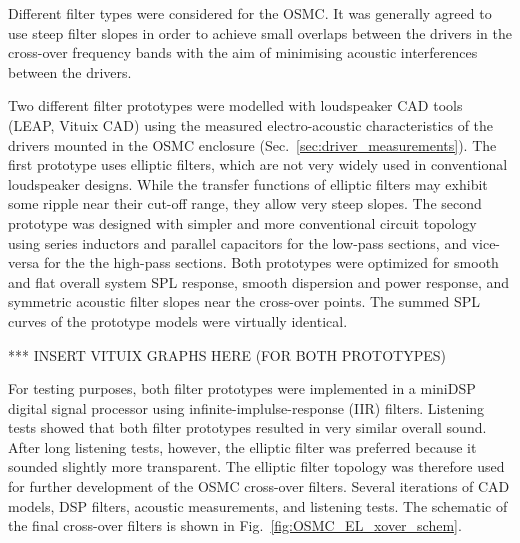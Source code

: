 \documentclass[12pt,a4paper]{article}
\providecommand{\figr}[1]{Fig.~\ref{fig:#1}}
\providecommand{\sectn}[1]{Sec.~\ref{sec:#1}}
\begin{document}
Different filter types were considered for the OSMC. It was generally agreed to use steep filter slopes in order to achieve small overlaps between the drivers in the cross-over frequency bands with the aim of minimising acoustic interferences between the drivers.

Two different filter prototypes\cite{osmc_p685} were modelled with loudspeaker CAD tools (LEAP, Vituix CAD) using the measured electro-acoustic characteristics of the drivers mounted in the OSMC enclosure (\sectn{driver_measurements}). The first prototype uses elliptic filters, which are not very widely used in conventional loudspeaker designs. While the transfer functions of elliptic filters may exhibit some ripple near their cut-off range, they allow very steep slopes. The second prototype was designed with simpler and more conventional circuit topology using series inductors and parallel capacitors for the low-pass sections, and vice-versa for the the high-pass sections. Both prototypes were optimized for smooth and flat overall system SPL response, smooth dispersion and power response, and symmetric acoustic filter slopes near the cross-over points. The summed SPL curves of the prototype models were virtually identical.

*** INSERT VITUIX GRAPHS HERE (FOR BOTH PROTOTYPES)

For testing purposes, both filter prototypes were implemented in a miniDSP digital signal processor using infinite-implulse-response (IIR) filters. Listening tests showed that both filter prototypes resulted in very similar overall sound. After long listening tests, however, the elliptic filter was preferred because it sounded slightly more transparent\cite{osmc_p708}. The elliptic filter topology was therefore used for further development of the OSMC cross-over filters. Several iterations of CAD models, DSP filters, acoustic measurements, and listening tests. The schematic of the final cross-over filters is shown in \figr{OSMC_EL_xover_schem}.
\end{document}

